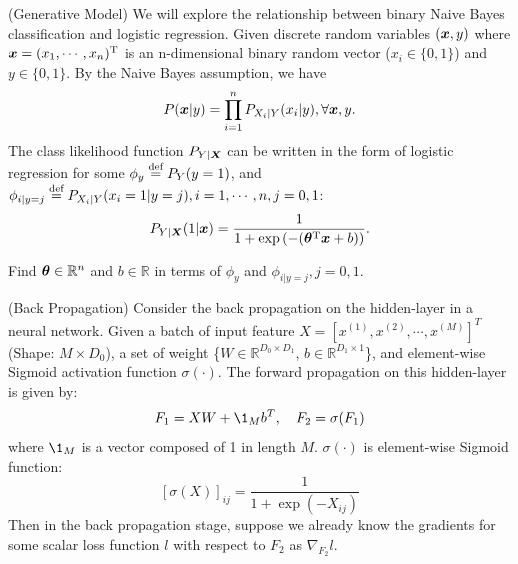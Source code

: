 \documentclass[a4paper,answers,12pt]{exam} %
\begin{document}
\begin{questions}
\begin{solution}
\end{solution}
\question[20](Generative Model) We will explore the relationship between binary Naive Bayes classification and logistic regression.  %
Given discrete random variables $(\bm{x}, y)$ where %
$\bm{x}=(x_1,\cdots,x_n)^{\mathrm{T}}$ is an n-dimensional binary random vector ($x_i\in\{0,1\}$)  and $y\in\{0,1\}$. By the Naive Bayes assumption,  we have %
\[
    P(\bm{x}|y)=\prod_{i=1}^{n} P_{X_i|Y} (x_i|y), \forall \bm{x}, y.
\]
The class likelihood function $P_{Y|\bm{X}}$   can be written in the form of logistic regression for some $\phi_y\stackrel{\text{def}}{=} P_Y(y=1)$, and $\phi_{i|y=j}\stackrel{\text{def}}{=} P_{X_i|Y} (x_i=1|y=j), i=1,\cdots,n, j=0,1$:
\begin{align*}
    P_{Y|\bm{X}}(1|\bm{x}) = \frac{1}{1+\exp{(-(\bm{\theta}^{\mathrm{T}}\bm{x}+b))}}.
\end{align*}

Find $\bm{\theta}\in\mathbb{R}^n$ and $b\in\mathbb{R}$ in terms of $\phi_y$ and $\phi_{i|y=j},j=0,1$.

  
  \question[20] (Back Propagation) Consider the back propagation on the hidden-layer in a neural network. Given a batch of input feature $X=[x^{(1)}, x^{(2)}, \cdots, x^{(M)}]^T$ (Shape: $M\times D_0$), a set of weight \{$W\in\mathbb{R}^{D_0\times D_1}$, $b\in\mathbb{R}^{D_1\times 1}$\}, and element-wise Sigmoid activation function $\sigma(\cdot)$. The forward propagation on this hidden-layer is given by:
  \[
  F_1=XW+\1_Mb^T, \quad F_2=\sigma(F_1)
  \]
  where $\1_M$ is a vector composed of 1 in length $M$. $\sigma(\cdot)$ is element-wise Sigmoid function:
  \[
  [\sigma(X)]_{ij}=\frac{1}{1+\exp(-X_{ij})}
  \]
  Then in the back propagation stage, suppose we already know the gradients for some scalar loss function $l$ with respect to $F_2$ as $\nabla_{F_2}l$.
\end{questions}
\end{document}

